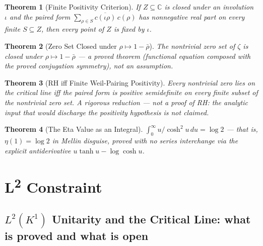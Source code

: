 \documentclass{report}
\newtheorem{theorem}{Theorem}[chapter]
\theoremstyle{definition}
\begin{document}
\begin{theorem}[Finite Positivity Criterion]
  \label{thm:weil-criterion}
  \leanok
  If $Z \subseteq \mathbb C$ is closed under an involution $\iota$ and the paired form
  $\sum_{\rho \in S} \overline{c(\iota\rho)}\,c(\rho)$ has nonnegative real part on
  every finite $S \subseteq Z$, then every point of $Z$ is fixed by $\iota$.
\end{theorem}

\begin{theorem}[Zero Set Closed under $\rho \mapsto 1-\bar\rho$]
  \label{thm:zeros-closed}
  \leanok
  The nontrivial zero set of $\zeta$ is closed under $\rho \mapsto 1 - \bar\rho$ ---
  a proved theorem (functional equation composed with the proved conjugation
  symmetry), not an assumption.
\end{theorem}

\begin{theorem}[RH iff Finite Weil-Pairing Positivity]
  \label{thm:rh-iff-positivity}
  \leanok
  Every nontrivial zero lies on the critical line \emph{iff} the paired form is
  positive semidefinite on every finite subset of the nontrivial zero set. A
  rigorous reduction --- not a proof of RH: the analytic input that would discharge
  the positivity hypothesis is not claimed.
\end{theorem}

\begin{theorem}[The Eta Value as an Integral]
  \label{thm:sech-sq-integral}
  \leanok
  $\int_0^\infty u/\cosh^2 u\,du = \log 2$ --- that is, $\eta(1) = \log 2$ in Mellin
  disguise, proved with no series interchange via the explicit antiderivative
  $u\tanh u - \log\cosh u$.
\end{theorem}

\chapter{L\textsuperscript{2} Constraint}

\section{\texorpdfstring{$L^2(K^1)$}{L²(K¹)} Unitarity and the Critical Line: what is proved and what is open}
\end{document}
